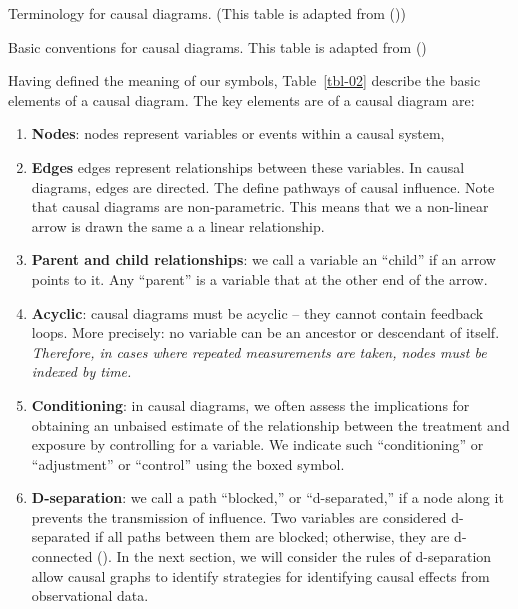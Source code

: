 \documentclass[
  singlecolumn]{article}
\begin{document}
\begin{table}

\caption{\label{tbl-01}Terminology for causal diagrams. (This table is
adapted from ())}

\centering{

\terminologylocalconventionssimple

}

\end{table}%

\begin{table}

\caption{\label{tbl-02}Basic conventions for causal diagrams. This table
is adapted from ()}

\centering{

\terminologygeneralbasic

}

\end{table}%

Having defined the meaning of our symbols, Table~\ref{tbl-02} describe
the basic elements of a causal diagram. The key elements are of a causal
diagram are:

\begin{enumerate}
\def\labelenumi{\arabic{enumi}.}
\item
  \textbf{Nodes}: nodes represent variables or events within a causal
  system,
\item
  \textbf{Edges} edges represent relationships between these variables.
  In causal diagrams, edges are directed. The define pathways of causal
  influence. Note that causal diagrams are non-parametric. This means
  that we a non-linear arrow is drawn the same a a linear relationship.
\item
  \textbf{Parent and child relationships}: we call a variable an
  ``child'' if an arrow points to it. Any ``parent'' is a variable that
  at the other end of the arrow.
\item
  \textbf{Acyclic}: causal diagrams must be acyclic -- they cannot
  contain feedback loops. More precisely: no variable can be an ancestor
  or descendant of itself. \emph{Therefore, in cases where repeated
  measurements are taken, nodes must be indexed by time.}
\item
  \textbf{Conditioning}: in causal diagrams, we often assess the
  implications for obtaining an unbaised estimate of the relationship
  between the treatment and exposure by controlling for a variable. We
  indicate such ``conditioning'' or ``adjustment'' or ``control'' using
  the boxed symbol.
\item
  \textbf{D-separation}: we call a path ``blocked,'' or ``d-separated,''
  if a node along it prevents the transmission of influence. Two
  variables are considered d-separated if all paths between them are
  blocked; otherwise, they are d-connected
  (). In the next section, we will
  consider the rules of d-separation allow causal graphs to identify
  strategies for identifying causal effects from observational data.
\end{enumerate}
\end{document}

